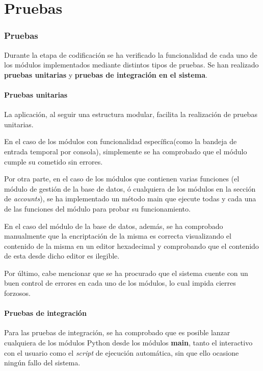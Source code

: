 \chapter{Pruebas}
\label{chap:pruebas}

\subsection{Pruebas}
Durante la etapa de codificación se ha verificado la funcionalidad de cada uno de los módulos implementados mediante distintos tipos de pruebas. 
Se han realizado \textbf{pruebas unitarias} y \textbf{pruebas de integración en el sistema}.

\subsubsection{Pruebas unitarias}

La aplicación, al seguir una estructura modular, facilita la realización de pruebas unitarias.

En el caso de los módulos con funcionalidad específica(como la bandeja de entrada temporal por consola), simplemente se ha comprobado que el módulo cumple su cometido sin errores.

Por otra parte, en el caso de los módulos que contienen varias funciones (el módulo de gestión de la base de datos, ó cualquiera de los módulos en la sección de \textit{accounts}), se ha implementado un método main que ejecute todas y cada una de las funciones del módulo para probar su funcionamiento.

En el caso del módulo de la base de datos, además, se ha comprobado manualmente que la encriptación de la misma es correcta visualizando el contenido de la misma en un editor hexadecimal y comprobando que el contenido de esta desde dicho editor es ilegible.

Por último, cabe mencionar que se ha procurado que el sistema cuente con un buen control de errores en cada uno de los módulos, lo cual impida cierres forzosos.

\subsubsection{Pruebas de integración}

Para las pruebas de integración, se ha comprobado que es posible lanzar cualquiera de los módulos Python desde los módulos \textbf{main}, tanto el interactivo con el usuario como el \textit{script} de ejecución automática, sin que ello ocasione ningún fallo del sistema.

